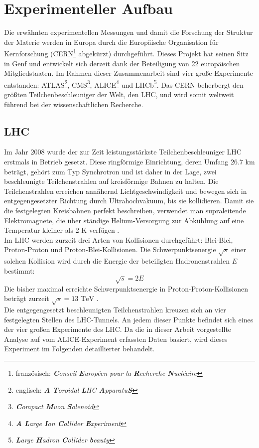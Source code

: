 \documentclass[12pt,a4paper]{report}
\begin{document}
\chapter{Experimenteller Aufbau}
\label{cha:EAufbau}
Die erwähnten experimentellen Messungen und damit die Forschung der Struktur der Materie werden in Europa durch die Europäische Organisation für Kernforschung (CERN\footnote{französisch: \textit{\textbf{C}onseil \textbf{E}uropéen pour la \textbf{R}echerche \textbf{N}ucléaire}} abgekürzt) durchgeführt. Dieses Projekt hat seinen Sitz in Genf und entwickelt sich derzeit dank der Beteiligung von 22 europäischen Mitgliedstaaten. Im Rahmen dieser Zusammenarbeit sind vier große Experimente entstanden: ATLAS\footnote{englisch: \textit{\textbf{A} \textbf{T}oroidal \textbf{L}HC \textbf{A}pparatu\textbf{S}}}, CMS\footnote{\textit{\textbf{C}ompact \textbf{M}uon \textbf{S}olenoid}}, ALICE\footnote{\textit{\textbf{A} \textbf{L}arge \textbf{I}on \textbf{C}ollider \textbf{E}xperiment}} und LHCb\footnote{\textit{\textbf{L}arge \textbf{H}adron \textbf{C}ollider \textbf{b}eauty}}. Das CERN beherbergt den größten Teilchenbeschleuniger der Welt, den LHC, und wird somit weltweit führend bei der wissenschaftlichen Recherche.  
\section{LHC}
\label{sec:LHC}
Im Jahr 2008 wurde der zur Zeit leistungsstärkste Teilchenbeschleuniger LHC erstmals in Betrieb gesetzt. Diese ringförmige Einrichtung, deren Umfang $26.7$ km beträgt, gehört zum Typ Synchrotron und ist daher in der Lage, zwei beschleunigte Teilchenstrahlen auf kreisförmige Bahnen zu halten. Die Teilchenstrahlen erreichen annähernd Lichtgeschwindigkeit und bewegen sich in entgegengesetzter Richtung durch Ultrahochvakuum, bis sie kollidieren. Damit sie die festgelegten Kreisbahnen perfekt beschreiben, verwendet man supraleitende Elektromagnete, die über ständige Helium-Versorgung zur Abkühlung auf eine Temperatur kleiner als $2$ K verfügen \cite{CernWebpage}.\\
Im LHC werden zurzeit drei Arten von Kollisionen durchgeführt: Blei-Blei, Proton-Proton und Proton-Blei-Kollisionen. Die Schwerpunktsenergie $\sqrt{s}$ einer solchen Kollision wird durch die Energie der beteiligten Hadronenstrahlen $E$ bestimmt:
\begin{equation}
\sqrt{s}=2E
\end{equation} 
Die bisher maximal erreichte Schwerpunktsenergie in Proton-Proton-Kollisionen beträgt zurzeit $\sqrt{s} = 13$ $\mathrm{TeV}$ \cite{Bruning:782076}. \\
Die entgegengesetzt beschleunigten Teilchenstrahlen kreuzen sich an vier festgelegten Stellen des LHC-Tunnels. An jedem dieser Punkte befindet sich eines der vier großen Experimente des LHC. Da die in dieser Arbeit vorgestellte Analyse auf vom ALICE-Experiment erfassten Daten basiert, wird dieses Experiment im Folgenden detaillierter behandelt.
\end{document}
